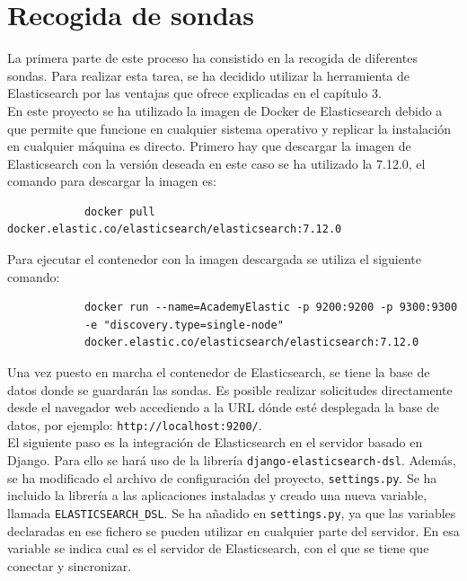 \section{Recogida de sondas}
La primera parte de este proceso ha consistido en la recogida de diferentes sondas. Para realizar esta tarea, se ha decidido utilizar la herramienta de Elasticsearch por las ventajas que ofrece explicadas en el capítulo 3.\\

En este proyecto se ha utilizado la imagen de Docker de Elasticsearch debido a que permite que funcione en cualquier sistema operativo y replicar la instalación en cualquier máquina es directo. Primero hay que descargar la imagen de Elasticsearch con la versión deseada en este caso se ha utilizado la 7.12.0, el comando para descargar la imagen es:
{\footnotesize
		\begin{verbatim}
			docker pull docker.elastic.co/elasticsearch/elasticsearch:7.12.0
		\end{verbatim}
		}
        
Para ejecutar el contenedor con la imagen descargada se utiliza el siguiente comando:

{\footnotesize
		\begin{verbatim}
			docker run --name=AcademyElastic -p 9200:9200 -p 9300:9300
            -e "discovery.type=single-node" 
            docker.elastic.co/elasticsearch/elasticsearch:7.12.0
		\end{verbatim}
		}
\newpage
  Una vez puesto en marcha el contenedor de Elasticsearch, se tiene la base de datos donde se guardarán las sondas. Es posible realizar solicitudes directamente desde el navegador web accediendo a la URL dónde esté desplegada la base de datos, por ejemplo: \texttt{http://localhost:9200/}.\\
  
  El siguiente paso es la integración de Elasticsearch en el servidor basado en Django. Para ello se hará uso de la librería \texttt{django-elasticsearch-dsl}. Además, se ha modificado el archivo de configuración del proyecto, \texttt{settings.py}. Se ha incluido la librería a las aplicaciones instaladas y creado una nueva variable, llamada \texttt{ELASTICSEARCH\_DSL}. Se ha añadido en \texttt{settings.py}, ya que las variables declaradas en ese fichero se pueden utilizar en cualquier parte del servidor. En esa variable se indica cual es el servidor de Elasticsearch, con el que se tiene que conectar y sincronizar.\\
  
